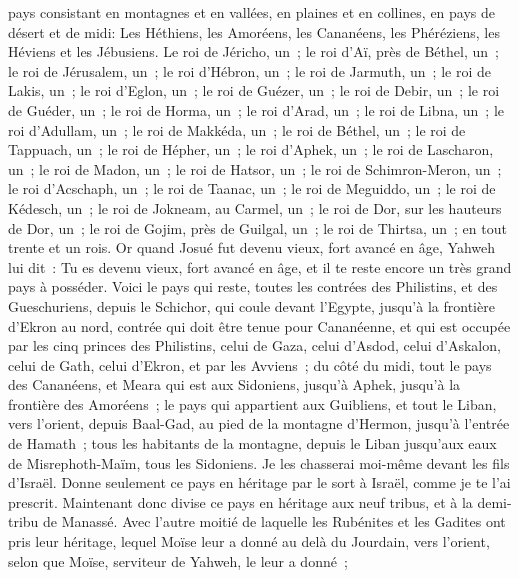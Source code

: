\begin{multicols}{2}
pays consistant en montagnes et en vallées, en plaines et en collines, en pays de désert et de midi: Les Héthiens, les Amoréens, les Cananéens, les Phéréziens, les Héviens et les Jébusiens.
Le roi de Jéricho, un~; le roi d'Aï, près de Béthel, un~;
le roi de Jérusalem, un~; le roi d'Hébron, un~;
le roi de Jarmuth, un~; le roi de Lakis, un~;
le roi d'Eglon, un~; le roi de Guézer, un~;
le roi de Debir, un~; le roi de Guéder, un~;
le roi de Horma, un~; le roi d'Arad, un~;
le roi de Libna, un~; le roi d'Adullam, un~;
le roi de Makkéda, un~; le roi de Béthel, un~;
le roi de Tappuach, un~; le roi de Hépher, un~;
le roi d'Aphek, un~; le roi de Lascharon, un~;
le roi de Madon, un~; le roi de Hatsor, un~;
le roi de Schimron-Meron, un~; le roi d'Acschaph, un~;
le roi de Taanac, un~; le roi de Meguiddo, un~;
le roi de Kédesch, un~; le roi de Jokneam, au Carmel, un~;
le roi de Dor, sur les hauteurs de Dor, un~; le roi de Gojim, près de Guilgal, un~;
le roi de Thirtsa, un~; en tout trente et un rois.
\VerseOne{}Or quand Josué fut devenu vieux, fort avancé en âge, Yahweh lui dit~: Tu es devenu vieux, fort avancé en âge, et il te reste encore un très grand pays à posséder.
Voici le pays qui reste, toutes les contrées des Philistins, et des Gueschuriens,
depuis le Schichor, qui coule devant l'Egypte, jusqu'à la frontière d'Ekron au nord, contrée qui doit être tenue pour Cananéenne, et qui est occupée par les cinq princes des Philistins, celui de Gaza, celui d'Asdod, celui d'Askalon, celui de Gath, celui d'Ekron, et par les Avviens~;
du côté du midi, tout le pays des Cananéens, et Meara qui est aux Sidoniens, jusqu'à Aphek, jusqu'à la frontière des Amoréens~;
le pays qui appartient aux Guibliens, et tout le Liban, vers l'orient, depuis Baal-Gad, au pied de la montagne d'Hermon, jusqu'à l'entrée de Hamath~;
tous les habitants de la montagne, depuis le Liban jusqu'aux eaux de Misrephoth-Maïm, tous les Sidoniens. Je les chasserai moi-même devant les fils d'Israël. Donne seulement ce pays en héritage par le sort à Israël, comme je te l'ai prescrit.
Maintenant donc divise ce pays en héritage aux neuf tribus, et à la demi-tribu de Manassé.
Avec l'autre moitié de laquelle les Rubénites et les Gadites ont pris leur héritage, lequel Moïse leur a donné au delà du Jourdain, vers l'orient, selon que Moïse, serviteur de Yahweh, le leur a donné~;

\end{multicols}
